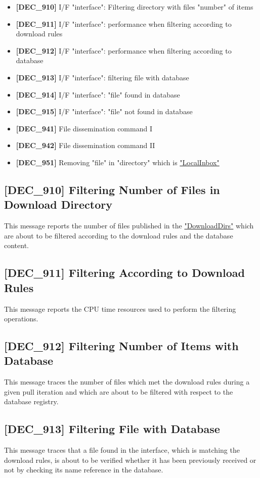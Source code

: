 \documentclass[dec_sum_main.tex]{subfiles}
\begin{document}
\begin{itemize}
	\item \textbf{[DEC\_910]} I/F "interface": Filtering directory with files "number" of items
	\item \textbf{[DEC\_911]} I/F "interface": performance when filtering according to download rules 
	\item \textbf{[DEC\_912]} I/F "interface": performance when filtering according to database
	\item \textbf{[DEC\_913]} I/F "interface": filtering file with database
	\item \textbf{[DEC\_914]} I/F "interface": "file" found in database
	\item \textbf{[DEC\_915]} I/F "interface": "file" not found in database	
	\item \textbf{[DEC\_941]} File dissemination command I
	\item \textbf{[DEC\_942]} File dissemination command II	
	\item \textbf{[DEC\_951]} Removing "file" in "directory" which is \hyperref[LocalInbox]{"LocalInbox"}
\end{itemize}

\subsection{[DEC\_910] Filtering Number of Files in Download Directory}
\label{DEC910}
This message reports the number of files published in the \hyperref[DownloadDirs]{"DownloadDirs"} which are about to be filtered according to the download rules and the database content.

\subsection{[DEC\_911] Filtering According to Download Rules}
\label{DEC911}
This message reports the CPU time resources used to perform the filtering operations.

\label{DEC912}
\subsection{[DEC\_912] Filtering Number of Items with Database}
This message traces the number of files which met the download rules during a given pull iteration and which are about to be filtered with respect to the database registry.

\label{DEC913}
\subsection{[DEC\_913] Filtering File with Database}
This message traces that a file found in the interface, which is matching the download rules, is about to be verified whether it has been previously received or not by checking its name reference in the database. 
\end{document}
